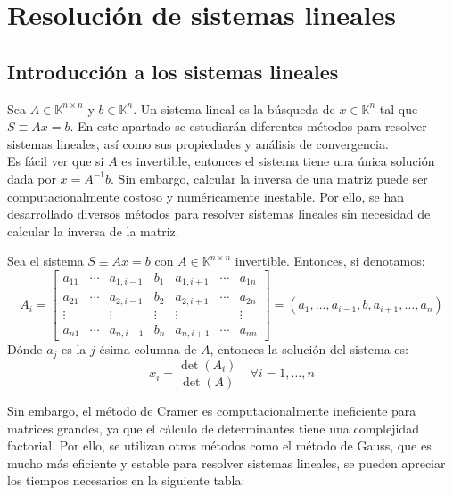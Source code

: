 \section{Resolución de sistemas lineales}
\subsection{Introducción a los sistemas lineales}

Sea $A \in \mathbb{K}^{n \times n}$ y $b \in \mathbb{K}^n$. Un sistema lineal es la búsqueda de $x \in \mathbb{K}^n$ tal que $S \equiv Ax=b$. En este apartado se estudiarán diferentes métodos para resolver sistemas lineales, así como sus propiedades y análisis de convergencia.\\

Es fácil ver que si $A$ es invertible, entonces el sistema tiene una única solución dada por $x=A^{-1}b$. Sin embargo, calcular la inversa de una matriz puede ser computacionalmente costoso y numéricamente inestable. Por ello, se han desarrollado diversos métodos para resolver sistemas lineales sin necesidad de calcular la inversa de la matriz.\\

\begin{teorema}
    Sea el sistema $S \equiv Ax=b$ con $A \in \mathbb{K}^{n \times n}$ invertible. Entonces, si denotamos:
    \[
        A_i = \begin{bmatrix}
            a_{11} & \cdots & a_{1,i-1} & b_1 & a_{1,i+1} & \cdots & a_{1n} \\
            a_{21} & \cdots & a_{2,i-1} & b_2 & a_{2,i+1} & \cdots & a_{2n} \\
            \vdots  &  & \vdots  & \vdots  & \vdots  &  & \vdots  \\
            a_{n1} & \cdots & a_{n,i-1} & b_n & a_{n,i+1} & \cdots & a_{nn}
        \end{bmatrix} =
        \left( a_1, \ldots, a_{i-1}, b, a_{i+1}, \ldots, a_n \right)
    \]
    Dónde $a_j$ es la $j$-ésima columna de $A$, entonces la solución del sistema es:
    \[
        x_i = \frac{\det(A_i)}{\det(A)} \quad \forall i=1, \ldots, n
    \]
\end{teorema}

Sin embargo, el método de Cramer es computacionalmente ineficiente para matrices grandes, ya que el cálculo de determinantes tiene una complejidad factorial. Por ello, se utilizan otros métodos como el método de Gauss, que es mucho más eficiente y estable para resolver sistemas lineales, se pueden apreciar los tiempos necesarios en la siguiente tabla:

